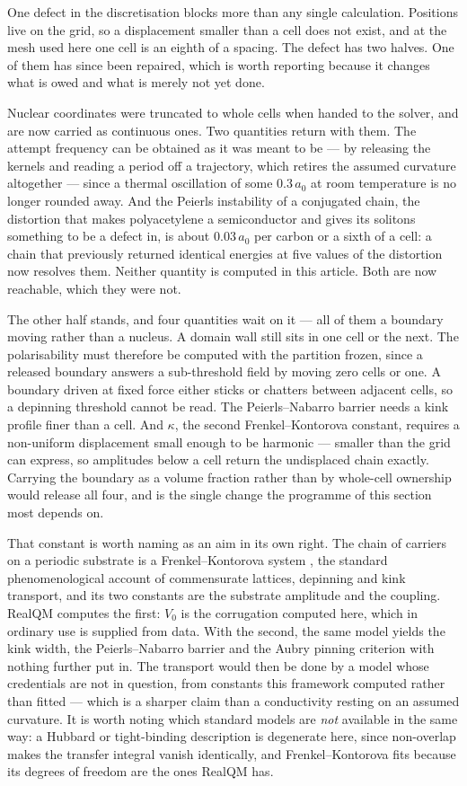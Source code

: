 \documentclass[11pt]{article}
\begin{document}
One defect in the discretisation blocks more than any single calculation. Positions live on the
grid, so a displacement smaller than a cell does not exist, and at the mesh used here one cell is an
eighth of a spacing. The defect has two halves. One of them has since been repaired, which is worth
reporting because it changes what is owed and what is merely not yet done.

Nuclear coordinates were truncated to whole cells when handed to the solver, and are now carried as
continuous ones. Two quantities return with them. The attempt frequency can be obtained as it was
meant to be --- by releasing the kernels and reading a period off a trajectory, which retires the
assumed curvature altogether --- since a thermal oscillation of some $0.3\,a_0$ at room temperature
is no longer rounded away. And the Peierls instability of a conjugated chain, the distortion that
makes polyacetylene a semiconductor and gives its solitons something to be a defect in, is about
$0.03\,a_0$ per carbon or a sixth of a cell: a chain that previously returned identical energies at
five values of the distortion now resolves them. Neither quantity is computed in this article.
Both are now reachable, which they were not.

The other half stands, and four quantities wait on it --- all of them a boundary moving rather than
a nucleus. A domain wall still sits in one cell or the next. The polarisability must therefore be
computed with the partition frozen, since a released boundary answers a sub-threshold field by
moving zero cells or one. A boundary driven at fixed force either sticks or chatters between
adjacent cells, so a depinning threshold cannot be read. The Peierls--Nabarro barrier needs a kink
profile finer than a cell. And $\kappa$, the second Frenkel--Kontorova constant, requires a
non-uniform displacement small enough to be harmonic --- smaller than the grid can express, so
amplitudes below a cell return the undisplaced chain exactly. Carrying the boundary as a volume
fraction rather than by whole-cell ownership would release all four, and is the single change the
programme of this section most depends on.

That constant is worth naming as an aim in its own right. The chain of carriers on a periodic
substrate is a Frenkel--Kontorova system \cite{braun}, the standard phenomenological account of
commensurate lattices, depinning and kink transport, and its two constants are the substrate
amplitude and the coupling. RealQM computes the first: $V_0$ is the corrugation computed here, which
in ordinary use is supplied from data. With the second, the same model yields the kink width, the
Peierls--Nabarro barrier and the Aubry pinning criterion \cite{aubry} with nothing further put in.
The transport would then be done by a model whose credentials are not in question, from constants
this framework computed rather than fitted --- which is a sharper claim than a conductivity resting
on an assumed curvature. It is worth noting which standard models are \emph{not} available in the
same way: a Hubbard or tight-binding description is degenerate here, since non-overlap makes the
transfer integral vanish identically, and Frenkel--Kontorova fits because its degrees of freedom are
the ones RealQM has.
\end{document}
